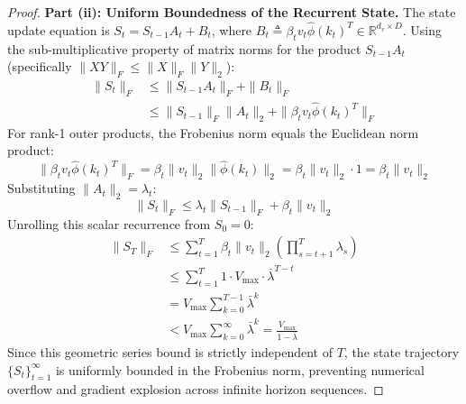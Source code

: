 \begin{proof}
\bigskip
\noindent
\textbf{Part (ii): Uniform Boundedness of the Recurrent State.}
The state update equation is $S_t = S_{t-1} A_t + B_t$, where $B_t \triangleq \beta_t v_t \hat{\phi}(k_t)^T \in \mathbb{R}^{d_v \times D}$. Using the sub-multiplicative property of matrix norms for the product $S_{t-1} A_t$ (specifically $\|X Y\|_F \le \|X\|_F \|Y\|_2$):
\begin{align}
\|S_t\|_F &\le \|S_{t-1} A_t\|_F + \|B_t\|_F \nonumber \\
          &\le \|S_{t-1}\|_F \|A_t\|_2 + \|\beta_t v_t \hat{\phi}(k_t)^T\|_F
\end{align}
For rank-1 outer products, the Frobenius norm equals the Euclidean norm product:
\begin{equation}
\|\beta_t v_t \hat{\phi}(k_t)^T\|_F = \beta_t \|v_t\|_2 \|\hat{\phi}(k_t)\|_2 = \beta_t \|v_t\|_2 \cdot 1 = \beta_t \|v_t\|_2
\end{equation}
Substituting $\|A_t\|_2 = \lambda_t$:
\begin{equation}
\|S_t\|_F \le \lambda_t \|S_{t-1}\|_F + \beta_t \|v_t\|_2
\end{equation}
Unrolling this scalar recurrence from $S_0 = 0$:
\begin{align}
\|S_T\|_F &\le \sum_{t=1}^T \beta_t \|v_t\|_2 \left( \prod_{s=t+1}^T \lambda_s \right) \nonumber \\
          &\le \sum_{t=1}^T 1 \cdot V_{\max} \cdot \bar{\lambda}^{T - t} \nonumber \\
          &= V_{\max} \sum_{k=0}^{T-1} \bar{\lambda}^k \nonumber \\
          &< V_{\max} \sum_{k=0}^{\infty} \bar{\lambda}^k = \frac{V_{\max}}{1 - \bar{\lambda}}
\end{align}
Since this geometric series bound is strictly independent of $T$, the state trajectory $\{S_t\}_{t=1}^\infty$ is uniformly bounded in the Frobenius norm, preventing numerical overflow and gradient explosion across infinite horizon sequences.
\end{proof}
